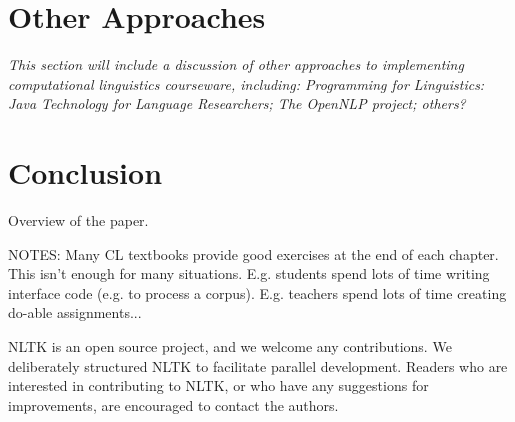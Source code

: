 \documentclass[11pt]{article}
\begin{document}
\section{Other Approaches}
\label{sec:approaches}

\textit{This section will include a discussion of other approaches to
implementing computational linguistics courseware, including:
Programming for Linguistics: Java Technology for Language
Researchers\cite{Hammond02}; The OpenNLP project\cite{opennlp};
others?}

\section{Conclusion}
\label{sec:conclusion}

Overview of the paper.

NOTES: Many CL textbooks provide good exercises at the end of each
chapter.  This isn't enough for many situations.  E.g. students spend
lots of time writing interface code (e.g. to process a corpus).
E.g. teachers spend lots of time creating do-able assignments...

NLTK is an open source project, and we welcome any contributions.  We
deliberately structured NLTK to facilitate parallel development.
Readers who are interested in contributing to NLTK, or who have any
suggestions for improvements, are encouraged to contact the authors.




\end{document}

